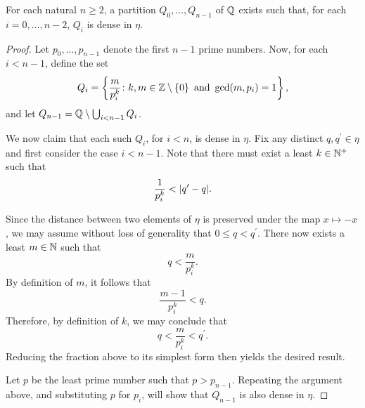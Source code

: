 \begin{prp}\label{prp:qdense}
	For each natural $n\geq 2$, a partition $Q_0,\dotsc,Q_{n-1}$ of $\mathbb{Q}$
	exists such that, for each $i=0,\dotsc,n-2$, $Q_i$ is dense in $\eta$.
\end{prp}
\begin{proof}
	Let $p_{0},\dotsc,p_{n-1}$ denote the first $n-1$ prime numbers.  Now, for each
	$i<n-1$, define the set
	\begin{equation}
		Q_{i}=\left\lbrace \frac{m}{p_{i}^{k}}\colon k,m\in\mathbb{Z}\setminus\left\lbrace 0\right\rbrace\text{
				and  }\gcd(m,p_{i})=1 \right\rbrace,
	\end{equation}
	and let $Q_{n-1}=\mathbb{Q}\setminus\bigcup_{i<n-1}Q_{i}$.

	We now claim that each such $Q_{i}$, for $i<n$, is dense in $\eta$.  Fix any
	distinct $q,q^{\prime}\in\eta$ and first consider the case $i<n-1$.  Note
	that there must exist a least $k\in\mathbb{N}^{+}$ such that
	\begin{equation}
		\frac{1}{p_{i}^{k}}<\lvert q^{\prime} - q\rvert.
	\end{equation}

	Since the distance between two elements of $\eta$ is preserved under the map
	$x\mapsto -x$, we may assume without loss of generality that
	$0\leq q<q^{\prime}$.  There now exists a least $m\in\mathbb{N}$ such that
	\begin{equation}
		q<\frac{m}{p_{i}^{k}}.
	\end{equation}
	By definition of $m$, it follows that
	\begin{equation}
		\frac{m-1}{p_{i}^{k}}<q.
	\end{equation}
	Therefore, by definition of $k$, we may conclude that
	\begin{equation}
		q<\frac{m}{p_{i}^{k}}<q^{\prime}.
	\end{equation}
	Reducing the fraction above to its simplest form then yields the desired
	result.

	Let $p$ be the least prime number such that $p>p_{n-1}$.  Repeating the
	argument above, and substituting $p$ for $p_{i}$, will show that $Q_{n-1}$
	is also dense in $\eta$.
\end{proof}

